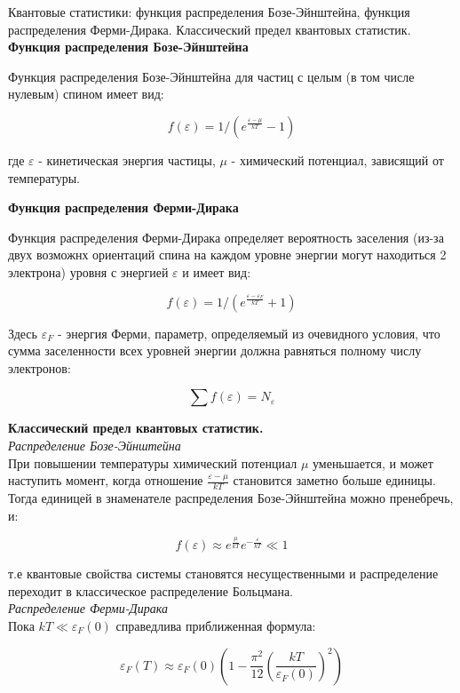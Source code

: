 \documentclass[__main__.tex]{subfiles}
\begin{document}
Квантовые статистики: функция распределения Бозе-Эйнштейна, функция распределения Ферми-Дирака. Классический предел квантовых статистик.\\ 

\textbf{Функция распределения Бозе-Эйнштейна}

Функция распределения Бозе-Эйнштейна для частиц с целым (в том числе нулевым) спином имеет вид:

$$f(\varepsilon) = 1/(e^{\frac{\varepsilon - \mu}{kT}} - 1)$$

где $\varepsilon$ - кинетическая энергия частицы, $\mu$ - химический потенциал, зависящий от температуры.

\textbf{Функция распределения Ферми-Дирака}

Функция распределения Ферми-Дирака определяет вероятность заселения (из-за двух возможнх ориентаций спина на каждом уровне энергии могут находиться 2 электрона) уровня с энергией $\varepsilon$ и имеет вид:

$$f(\varepsilon) = 1/(e^{\frac{\varepsilon - \varepsilon_F}{kT}} + 1)$$

Здесь $\varepsilon_F$ - энергия Ферми, параметр, определяемый из очевидного условия, что сумма заселенности всех уровней энергии должна равняться полному числу электронов:

$$\sum f(\varepsilon) = N_\varepsilon$$

\textbf{Классический предел квантовых статистик.}\\

\textit{Распределение Бозе-Эйнштейна}\\

При повышении температуры химический потенциал $\mu$ уменьшается, и может наступить момент, когда отношение $\frac{\varepsilon - \mu}{kT}$ становится заметно больше единицы. Тогда единицей в знаменателе распределения Бозе-Эйнштейна можно пренебречь, и:

$$f(\varepsilon) \approx e^\frac{\mu}{kT} e^{-\frac{\varepsilon}{kT}} \ll 1$$

т.е квантовые свойства системы становятся несущественными и распределение переходит в классическое распределение Больцмана.\\

\textit{Распределение Ферми-Дирака}\\

Пока $kT \ll \varepsilon_F(0)$ справедлива приближенная формула:

$$\varepsilon_F(T) \approx \varepsilon_F(0)\left(1 - \frac{\pi^2}{12}\left(\frac{kT}{\varepsilon_F(0)}\right)^2\right)$$
\end{document}
